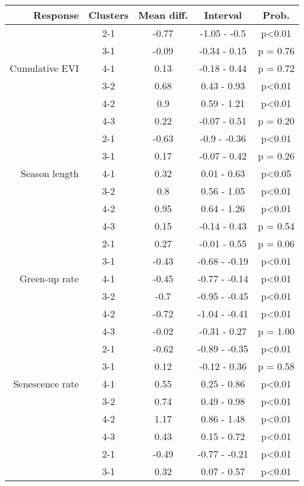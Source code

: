 \begin{table}[H]
\centering
\begin{tabular}{rcccc}
  \hline
Response & Clusters & Mean diff. & Interval & Prob. \\ 
  \hline
 & 2-1 & -0.77 & -1.05 - -0.5 & p<0.01 \\ 
   & 3-1 & -0.09 & -0.34 - 0.15 & p = 0.76 \\ 
  Cumulative EVI & 4-1 &  0.13 & -0.18 - 0.44 & p = 0.72 \\ 
   & 3-2 &  0.68 & 0.43 - 0.93 & p<0.01 \\ 
   & 4-2 &   0.9 & 0.59 - 1.21 & p<0.01 \\ 
   & 4-3 &  0.22 & -0.07 - 0.51 & p = 0.20 \\ 
   \hline
 & 2-1 & -0.63 & -0.9 - -0.36 & p<0.01 \\ 
   & 3-1 &  0.17 & -0.07 - 0.42 & p = 0.26 \\ 
  Season length & 4-1 &  0.32 & 0.01 - 0.63 & p<0.05 \\ 
   & 3-2 &   0.8 & 0.56 - 1.05 & p<0.01 \\ 
   & 4-2 &  0.95 & 0.64 - 1.26 & p<0.01 \\ 
   & 4-3 &  0.15 & -0.14 - 0.43 & p = 0.54 \\ 
   \hline
 & 2-1 &  0.27 & -0.01 - 0.55 & p = 0.06 \\ 
   & 3-1 & -0.43 & -0.68 - -0.19 & p<0.01 \\ 
  Green-up rate & 4-1 & -0.45 & -0.77 - -0.14 & p<0.01 \\ 
   & 3-2 &  -0.7 & -0.95 - -0.45 & p<0.01 \\ 
   & 4-2 & -0.72 & -1.04 - -0.41 & p<0.01 \\ 
   & 4-3 & -0.02 & -0.31 - 0.27 & p = 1.00 \\ 
   \hline
 & 2-1 & -0.62 & -0.89 - -0.35 & p<0.01 \\ 
   & 3-1 &  0.12 & -0.12 - 0.36 & p = 0.58 \\ 
  Senescence rate & 4-1 &  0.55 & 0.25 - 0.86 & p<0.01 \\ 
   & 3-2 &  0.74 & 0.49 - 0.98 & p<0.01 \\ 
   & 4-2 &  1.17 & 0.86 - 1.48 & p<0.01 \\ 
   & 4-3 &  0.43 & 0.15 - 0.72 & p<0.01 \\ 
   \hline
 & 2-1 & -0.49 & -0.77 - -0.21 & p<0.01 \\ 
   & 3-1 &  0.32 & 0.07 - 0.57 & p<0.01 \\ 

\end{tabular}
\end{table}
